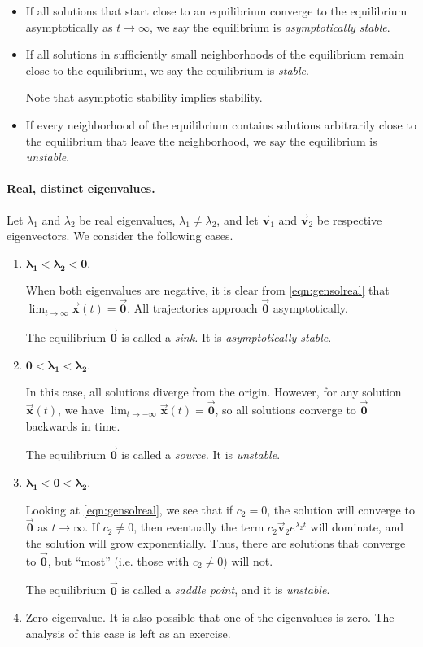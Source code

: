 \documentclass{book}
\newcommand{\BV}{\vec{\textbf{v}}}
\newcommand{\BX}{\vec{\textbf{x}}}
\newcommand{\BZ}{\vec{\textbf{0}}}  %
\newcommand{\ds}{\displaystyle}
\begin{document}
\begin{itemize}
\item If all solutions that start close to an equilibrium converge
to the equilibrium asymptotically as $t\rightarrow\infty$, we
say the equilibrium is
\emph{asymptotically stable}.
\item If all solutions in sufficiently small neighborhoods
of the equilibrium remain close to the equilibrium, we say
the equilibrium is \emph{stable}.

Note that asymptotic stability implies stability.
\item If every neighborhood of the equilibrium contains solutions
arbitrarily close to the equilibrium that leave the neighborhood, we say the equilibrium is \emph{unstable}. 
\end{itemize}

\paragraph{Real, distinct eigenvalues.}
Let $\lambda_1$ and $\lambda_2$ be real eigenvalues,
$\lambda_1\ne\lambda_2$, and let $\BV_1$ and $\BV_2$
be respective eigenvectors.  We consider the following
cases.
\begin{enumerate}
\item $\pmb{\lambda_1 < \lambda_2 < 0}$.

When both eigenvalues are negative, it is clear from
\eqref{eqn:gensolreal}
that $\ds\lim_{t\rightarrow\infty}\BX(t) = \BZ$. All
trajectories approach $\BZ$ asymptotically.

The equilibrium $\BZ$ is called a \emph{sink.}
It is \emph{asymptotically stable}.

\item $\pmb{0 < \lambda_1 < \lambda _2}$.

In this case, all solutions diverge from the origin.
However, for any solution $\BX(t)$, we have
$\ds\lim_{t\rightarrow -\infty}\BX(t) = \BZ$, so all solutions 
converge to $\BZ$ backwards in time.

The equilibrium $\BZ$ is called a \emph{source.}
It is \emph{unstable}.

\item $\pmb{\lambda_1 < 0 < \lambda_2}$.

Looking at \eqref{eqn:gensolreal}, we see that if $c_2=0$, the solution
will converge to $\BZ$ as $t\rightarrow\infty$.
If $c_2\ne 0$, then eventually the term $c_2\BV_2e^{\lambda_2 t}$ will
dominate, and the solution will grow exponentially.
Thus, there are solutions that converge to $\BZ$, but ``most''
(i.e. those with $c_2\ne 0$) will not.

The equilibrium $\BZ$ is called a \emph{saddle point}, 
and it is \emph{unstable}.
\item Zero eigenvalue.  It is also possible that
one of the eigenvalues is zero.  The analysis
of this case is left as an exercise.
\end{enumerate}
\end{document}
